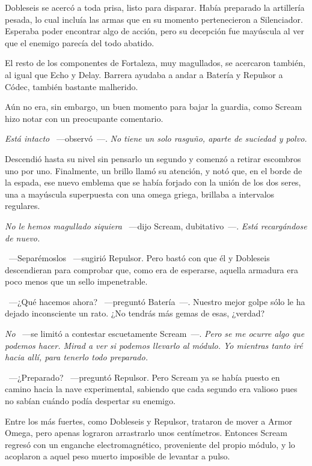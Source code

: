 Dobleseis se acercó a toda prisa, listo para disparar. Había preparado la artillería pesada, lo cual incluía las armas que en su momento pertenecieron a Silenciador. Esperaba poder encontrar algo de acción, pero su decepción fue mayúscula al ver que el enemigo parecía del todo abatido.

El resto de los componentes de Fortaleza, muy magullados, se acercaron también, al igual que Echo y Delay. Barrera ayudaba a andar a Batería y Repulsor a Códec, también bastante malherido.

Aún no era, sin embargo, un buen momento para bajar la guardia, como Scream hizo notar con un preocupante comentario.

\emph{Está intacto} ~---observó~---. \emph{No tiene un solo rasguño, aparte de suciedad y polvo.}

Descendió hasta su nivel sin pensarlo un segundo y comenzó a retirar escombros uno por uno. Finalmente, un brillo llamó su atención, y notó que, en el borde de la espada, ese nuevo emblema que se había forjado con la unión de los dos seres, una a mayúscula superpuesta con una omega griega, brillaba a intervalos regulares.

\emph{No le hemos magullado siquiera} ~---dijo Scream, dubitativo~---. \emph{Está recargándose de nuevo.}

~---Separémoslos ~---sugirió Repulsor. Pero bastó con que él y Dobleseis descendieran para comprobar que, como era de esperarse, aquella armadura era poco menos que un sello impenetrable.

~---¿Qué hacemos ahora? ~---preguntó Batería~---. Nuestro mejor golpe sólo le ha dejado inconsciente un rato. ¿No tendrás más gemas de esas, ¿verdad?

\emph{No} ~---se limitó a contestar escuetamente Scream~---. \emph{Pero se me ocurre algo que podemos hacer. Mirad a ver si podemos llevarlo al módulo. Yo mientras tanto iré hacia allí, para tenerlo todo preparado.}

~---¿Preparado? ~---preguntó Repulsor. Pero Scream ya se había puesto en camino hacia la nave experimental, sabiendo que cada segundo era valioso pues no sabían cuándo podía despertar su enemigo.

Entre los más fuertes, como Dobleseis y Repulsor, trataron de mover a Armor Omega, pero apenas lograron arrastrarlo unos centímetros. Entonces Scream regresó con un enganche electromagnético, proveniente del propio módulo, y lo acoplaron a aquel peso muerto imposible de levantar a pulso.

